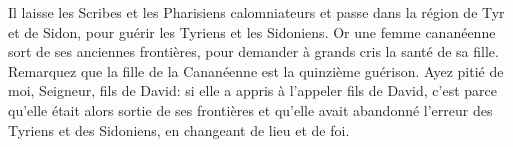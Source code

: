 Il laisse les Scribes et les Pharisiens calomniateurs
	et passe dans la région de Tyr et de Sidon,
	pour guérir les Tyriens et les Sidoniens.
Or une femme cananéenne sort de ses anciennes frontières,
	pour demander à grands cris la santé de sa fille.
Remarquez que la fille de la Cananéenne est la quinzième guérison.
Ayez pitié de moi, Seigneur, fils de David:
	si elle a appris à l’appeler fils de David,
	c’est parce qu’elle était alors sortie de ses frontières
	et qu’elle avait abandonné l’erreur des Tyriens et des Sidoniens,
	en changeant de lieu et de foi.
